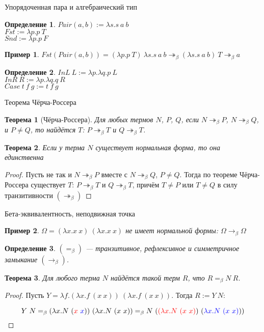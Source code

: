 \documentclass[aspectratio=169]{beamer}
\newtheorem{thm}{Теорема}[section]
\newtheorem{dfn}{Определение}[section]
\newtheorem{exm}{Пример}[section]
\begin{document}
\begin{frame}{Упорядоченная пара и алгебраический тип}
\begin{dfn}$Pair(a,b) := \lambda s.s\ a\ b$\\
$Fst := \lambda p.p\ T$\\
$Snd := \lambda p.p\ F$
\end{dfn}

\begin{exm}
$Fst (Pair (a,b)) = (\lambda p.p\ T)\ \lambda s.s\ a\ b \twoheadrightarrow_\beta (\lambda s.s\ a\ b)\ T \twoheadrightarrow_\beta a$
\end{exm}

\begin{dfn}
$InL\ L := \lambda p.\lambda q.p\ L$\\
$InR\ R := \lambda p.\lambda q.q\ R$\\
$Case\ t\ f\ g := t\ f\ g$
\end{dfn}

\end{frame}

\begin{frame}{Теорема Чёрча-Россера}
\begin{thm}[Чёрча-Россера] Для любых термов $N$, $P$, $Q$, если $N \twoheadrightarrow_\beta P$, $N \twoheadrightarrow_\beta Q$,
и $P \ne Q$, то найдётся $T$: $P \twoheadrightarrow_\beta T$ и $Q \twoheadrightarrow_\beta T$.\end{thm}
\begin{thm}Если у терма $N$ существует нормальная форма, то она единственна\end{thm}
\begin{proof}Пусть не так и $N \twoheadrightarrow_\beta P$ вместе с $N \twoheadrightarrow_\beta Q$, $P \ne Q$.
Тогда по теореме Чёрча-Россера существует $T$: $P \twoheadrightarrow_\beta T$ и $Q \twoheadrightarrow_\beta T$,
причём $T \ne P$ или $T \ne Q$ в силу транзитивности $(\twoheadrightarrow_\beta)$\end{proof}
\end{frame}

\begin{frame}{Бета-эквивалентность, неподвижная точка}
\begin{exm}$\Omega = (\lambda x.x\ x)\ (\lambda x.x\ x)$ не имеет нормальной формы:
$\Omega \rightarrow_\beta \Omega$\end{exm}
\begin{dfn}$(=_\beta)$ --- транзитивное, рефлексивное и симметричное замыкание $(\rightarrow_\beta)$.\end{dfn}
\begin{thm}Для любого терма $N$ найдётся такой терм $R$, что $R =_\beta N\ R$.\end{thm}
\begin{proof}Пусть $Y = \lambda f.(\lambda x.f\ (x\ x))\ (\lambda x.f\ (x\ x))$.
Тогда $R := Y\ N$:

$$Y\ N =_\beta (\lambda x.N\ ({\color{red}x}\ {\color{blue}x}))\ (\lambda x.N\ (x\ x)) =_\beta N\ ({\color{red}(\lambda x.N\ (x\ x)})\ ({\color{blue}\lambda x.N\ (x\ x)}))$$
\end{proof}
\end{frame}
\end{document}
